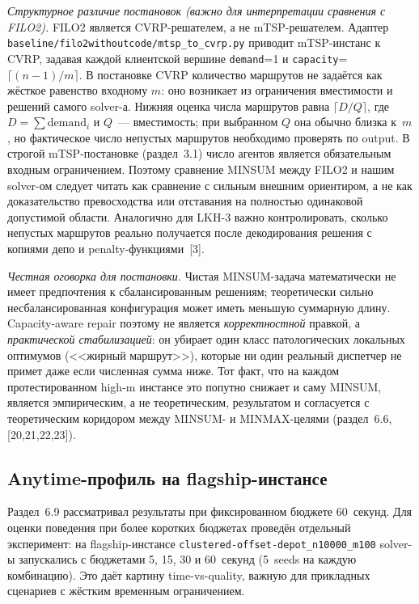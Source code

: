 \documentclass[14pt,a4paper]{extarticle}
\newcommand{\source}[1]{[#1]}
\begin{document}
\textit{Структурное различие постановок (важно для интерпретации сравнения с FILO2).} FILO2 является CVRP-решателем, а не mTSP-решателем. Адаптер \texttt{baseline/filo2withoutcode/mtsp\_to\_cvrp.py} приводит mTSP-инстанс к CVRP, задавая каждой клиентской вершине \texttt{demand}=1 и \texttt{capacity}=$\lceil(n-1)/m\rceil$. В постановке CVRP количество маршрутов не задаётся как жёсткое равенство входному $m$: оно возникает из ограничения вместимости и решений самого solver-а. Нижняя оценка числа маршрутов равна $\lceil D/Q \rceil$, где $D = \sum \mathrm{demand}_i$ и $Q$~--- вместимость; при выбранном $Q$ она обычно близка к~$m$, но фактическое число непустых маршрутов необходимо проверять по output. В строгой mTSP-постановке (раздел~3.1) число агентов является обязательным входным ограничением. Поэтому сравнение MINSUM между FILO2 и нашим solver-ом следует читать как сравнение с сильным внешним ориентиром, а не как доказательство превосходства или отставания на полностью одинаковой допустимой области. Аналогично для LKH-3 важно контролировать, сколько непустых маршрутов реально получается после декодирования решения с копиями депо и penalty-функциями~\source{3}.

\textit{Честная оговорка для постановки.} Чистая MINSUM-задача математически не имеет предпочтения к сбалансированным решениям; теоретически сильно несбалансированная конфигурация может иметь меньшую суммарную длину. Capacity-aware repair поэтому не является \emph{корректностной} правкой, а \emph{практической стабилизацией}: он убирает один класс патологических локальных оптимумов (<<жирный маршрут>>), которые ни один реальный диспетчер не примет даже если численная сумма ниже. Тот факт, что на каждом протестированном high-m инстансе это попутно снижает и саму MINSUM, является эмпирическим, а не теоретическим, результатом и согласуется с теоретическим коридором между MINSUM- и MINMAX-целями (раздел~6.6, \source{20,21,22,23}).

\subsection{Anytime-профиль на flagship-инстансе}

Раздел~6.9 рассматривал результаты при фиксированном бюджете 60~секунд. Для оценки поведения при более коротких бюджетах проведён отдельный эксперимент: на flagship-инстансе \texttt{clustered-offset-depot\_n10000\_m100} solver-ы запускались с бюджетами 5, 15, 30 и 60~секунд (5~seeds на каждую комбинацию). Это даёт картину time-vs-quality, важную для прикладных сценариев с жёстким временным ограничением.
\end{document}
